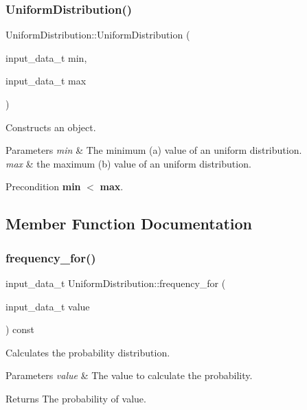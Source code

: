 \subsubsection{\texorpdfstring{Uniform\+Distribution()}{UniformDistribution()}}
{\footnotesize\ttfamily Uniform\+Distribution\+::\+Uniform\+Distribution (\begin{DoxyParamCaption}\item[{input\+\_\+data\+\_\+t}]{min,  }\item[{input\+\_\+data\+\_\+t}]{max }\end{DoxyParamCaption})\hspace{0.3cm}{\ttfamily [inline]}}

Constructs an object. 
\begin{DoxyParams}{Parameters}
{\em min} & The minimum (a) value of an uniform distribution. \\
\hline
{\em max} & the maximum (b) value of an uniform distribution. \\
\hline
\end{DoxyParams}
\begin{DoxyPrecond}{Precondition}
{\bfseries min} $<$ {\bfseries max}. 
\end{DoxyPrecond}


\subsection{Member Function Documentation}
\mbox{\label{classUniformDistribution_a3bf3390b5717b5958e36726b12aa953b}} 
\subsubsection{\texorpdfstring{frequency\+\_\+for()}{frequency\_for()}}
{\footnotesize\ttfamily input\+\_\+data\+\_\+t Uniform\+Distribution\+::frequency\+\_\+for (\begin{DoxyParamCaption}\item[{input\+\_\+data\+\_\+t}]{value }\end{DoxyParamCaption}) const\hspace{0.3cm}{\ttfamily [virtual]}}

Calculates the probability distribution. 
\begin{DoxyParams}{Parameters}
{\em value} & The value to calculate the probability. \\
\hline
\end{DoxyParams}
\begin{DoxyReturn}{Returns}
The probability of value. 
\end{DoxyReturn}


